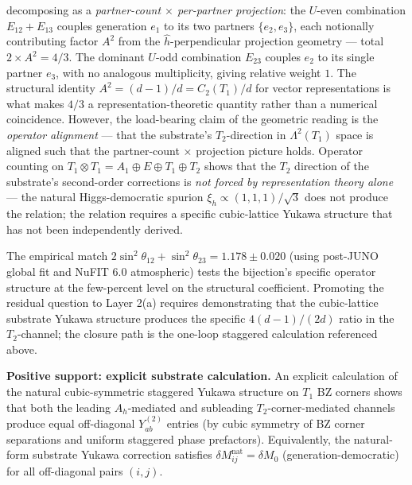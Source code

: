 \documentclass[
]{article}
\begin{document}
decomposing as a \emph{partner-count \(\times\) per-partner projection}:
the \(U\)-even combination \(E_{12}+E_{13}\) couples generation \(e_1\)
to its two partners \(\{e_2, e_3\}\), each notionally contributing
factor \(A^2\) from the \(\hat h\)-perpendicular projection geometry ---
total \(2 \times A^2 = 4/3\). The dominant \(U\)-odd combination
\(E_{23}\) couples \(e_2\) to its single partner \(e_3\), with no
analogous multiplicity, giving relative weight \(1\). The structural
identity \(A^2 = (d-1)/d = C_2(T_1)/d\) for vector representations is
what makes \(4/3\) a representation-theoretic quantity rather than a
numerical coincidence. However, the load-bearing claim of the geometric
reading is the \emph{operator alignment} --- that the substrate's
\(T_2\)-direction in \(\Lambda^2(T_1)\) space is aligned such that the
partner-count × projection picture holds. Operator counting on
\(T_1 \otimes T_1 = A_1 \oplus E \oplus T_1 \oplus T_2\) shows that the
\(T_2\) direction of the substrate's second-order corrections is
\emph{not forced by representation theory alone} --- the natural
Higgs-democratic spurion \(\xi_h \propto (1,1,1)/\sqrt{3}\) does not
produce the relation; the relation requires a specific cubic-lattice
Yukawa structure that has not been independently derived.

The empirical match
\(2\sin^2\theta_{12}+\sin^2\theta_{23} = 1.178 \pm 0.020\) (using
post-JUNO global fit and NuFIT 6.0 atmospheric) tests the bijection's
specific operator structure at the few-percent level on the structural
coefficient. Promoting the residual question to Layer 2(a) requires
demonstrating that the cubic-lattice substrate Yukawa structure produces
the specific \(4(d-1)/(2d)\) ratio in the \(T_2\)-channel; the closure
path is the one-loop staggered calculation referenced above.

\textbf{Positive support: explicit substrate calculation.} An explicit
calculation of the natural cubic-symmetric staggered Yukawa structure on
\(T_1\) BZ corners shows that both the leading \(A_h\)-mediated and
subleading \(T_2\)-corner-mediated channels produce equal off-diagonal
\(Y^{(2)}_{ab}\) entries (by cubic symmetry of BZ corner separations and
uniform staggered phase prefactors). Equivalently, the natural-form
substrate Yukawa correction satisfies
\(\delta M_{ij}^{\text{nat}} = \delta M_0\) (generation-democratic) for
all off-diagonal pairs \((i,j)\).
\end{document}
